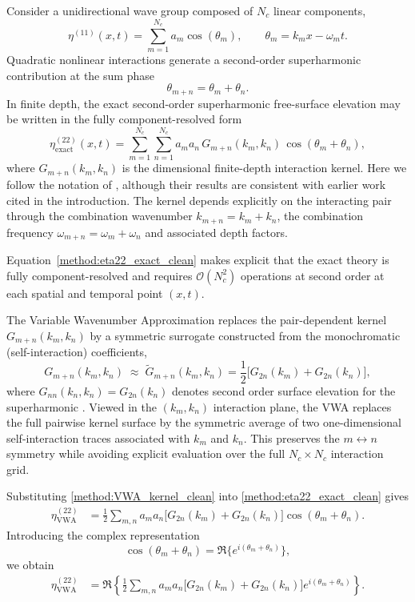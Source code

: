 \documentclass[lineno]{JFM-FLM_Au}
\begin{document}
Consider a unidirectional wave group composed of $N_c$ linear components,
\begin{equation}
\eta^{(11)}(x,t)
=
\sum_{m=1}^{N_c}
a_m \cos(\theta_m),
\qquad
\theta_m = k_m x - \omega_m t.
\end{equation}
Quadratic nonlinear interactions generate a second-order superharmonic contribution at the sum phase
\[
\theta_{m+n} = \theta_m + \theta_n .
\]
In finite depth, the exact second-order superharmonic free-surface elevation may be written in the fully component-resolved form
\begin{equation}\label{method:eta22_exact_clean}
\eta^{(22)}_{\mathrm{exact}}(x,t)
=
\sum_{m=1}^{N_c}\sum_{n=1}^{N_c}
a_m a_n\,
G_{m+n}(k_m,k_n)\,
\cos(\theta_m+\theta_n),
\end{equation}
where $G_{m+n}(k_m,k_n)$ is the dimensional finite-depth interaction kernel. Here we follow the notation of  \cite{madsen2006third,madsen2012third}, although their results are consistent with earlier work cited in the introduction. 
The kernel depends explicitly on the interacting pair through the combination wavenumber $k_{m+n}=k_m+k_n$, the combination frequency $\omega_{m+n}=\omega_m+\omega_n$ and associated depth factors.

Equation~\eqref{method:eta22_exact_clean} makes explicit that the exact theory is fully component-resolved and requires $\mathcal{O}(N_c^2)$ operations at second order at each spatial and temporal point $(x,t)$.


The Variable Wavenumber Approximation replaces the pair-dependent kernel
$G_{m+n}(k_m,k_n)$ by a symmetric surrogate constructed from the monochromatic (self-interaction) coefficients,
\begin{equation}\label{method:VWA_kernel_clean}
G_{m+n}(k_m,k_n)
\;\approx\;
\widetilde{G}_{m+n}(k_m,k_n)
=
\frac12\Big[
G_{2n}(k_m)+G_{2n}(k_n)
\Big],
\end{equation}
where $G_{nn}(k_n,k_n)=G_{2n}(k_n)$ denotes second order surface elevation for the superharmonic \citep{fenton1985fifth,zhao2022stokes}.
Viewed in the $(k_m,k_n)$ interaction plane, the VWA replaces the full pairwise kernel surface by the symmetric average of two one-dimensional self-interaction traces associated with $k_m$ and $k_n$. This preserves the $m\leftrightarrow n$ symmetry while avoiding explicit evaluation over the full $N_c\times N_c$ interaction grid.

Substituting \eqref{method:VWA_kernel_clean} into \eqref{method:eta22_exact_clean} gives
\begin{align}
\eta^{(22)}_{\mathrm{VWA}}
&=
\frac12
\sum_{m,n}
a_m a_n
\Big[
G_{2n}(k_m)+G_{2n}(k_n)
\Big]
\cos(\theta_m+\theta_n).
\end{align}
Introducing the complex representation
\[
\cos(\theta_m+\theta_n)
=
\Re\{e^{i(\theta_m+\theta_n)}\},
\]
we obtain
\begin{align}
\eta^{(22)}_{\mathrm{VWA}}
&=
\Re\left\{
\frac12
\sum_{m,n}
a_m a_n
\Big[
G_{2n}(k_m)+G_{2n}(k_n)
\Big]
e^{i(\theta_m+\theta_n)}
\right\}.
\end{align}
\end{document}
